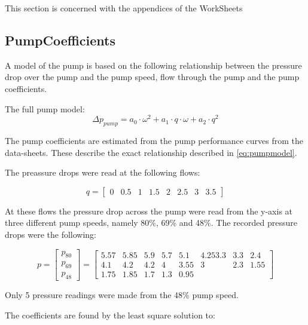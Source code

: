 This section is concerned with the appendices of the WorkSheets

\subsection{PumpCoefficients} \label{ap:PumpCoef}

A model of the pump is based on the following relationship between the pressure drop over the pump and the pump speed, flow through the pump and the pump coefficients.

The full pump model:
\begin{equation} \label{eq:pumpmodel}
		\Delta p_{pump}  = a_0  \cdot \omega^2 + a_1 \cdot q \cdot \omega + a_2 \cdot q^2
\end{equation}

The pump coefficients are estimated from the pump performance curves from the data-sheets. These describe the exact relationship described in \cref{eq:pumpmodel}.

The preassure drops were read at the following flows:

\begin{equation}
	q = \begin{bmatrix}
		0 & 0.5 & 1 & 1.5 & 2 & 2.5 & 3 & 3.5 
	\end{bmatrix} 
\label{eq:pump_q}
\end{equation}

At these flows the pressure drop across the pump were read from the y-axis at three different pump speeds, namely 80\%, 69\% and 48\%. The recorded pressure drops were the following:

\begin{equation}
	p =  \begin{bmatrix}
		p_{80}\\
		p_{69} \\
		p_{48}
	\end{bmatrix}  = 
	\begin{bmatrix}
		5.57 & 5.85 & 5.9 & 5.7 & 5.1 & 4.253.3 & 3.3 & 2.4 \\
		4.1 & 4.2 & 4.2 & 4 & 3.55 & 3 & 2.3 & 1.55 \\
		1.75 & 1.85 & 1.7 & 1.3 & 0.95 &  &  &  
	\end{bmatrix} 
\label{eq:pump_p}
\end{equation}

Only 5 pressure readings were made from the 48\% pump speed.

The coefficients are found by the least square solution to:

